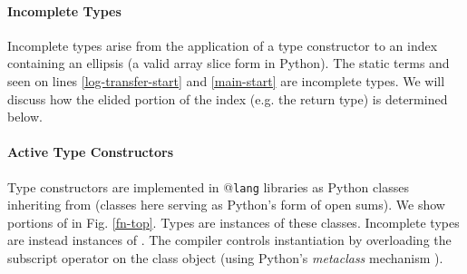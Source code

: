 \paragraph{Incomplete Types} Incomplete types arise from the application of a type constructor to an index containing an ellipsis (a valid array slice form in Python). The static terms  and  seen on lines \ref{log-transfer-start} and \ref{main-start} are incomplete types. We will discuss how the elided portion of the index (e.g. the return type) is determined below.

\paragraph{Active Type Constructors} Type constructors are implemented in @\texttt{lang} libraries as Python classes inheriting from  (classes here serving as Python's form of open sums). We show portions of  in Fig. \ref{fn-top}. Types are instances of these classes. Incomplete types are instead instances of . The compiler controls instantiation by overloading the subscript operator on the  class object (using Python's \emph{metaclass} mechanism \cite{python}).

